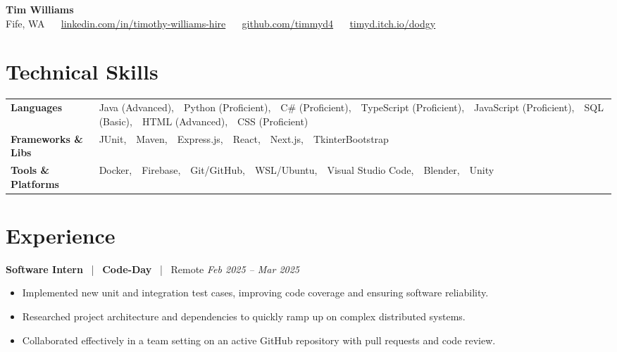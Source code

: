 \documentclass[10pt, letterpaper]{article}
\newcommand{\jobhead}[4]{%
  \vspace{5pt}%
  {\bfseries\color{dark}#1}%
  ~{\color{light}|}~%
  {\bfseries\color{navy}#2}%
  ~{\color{light}|}~%
  {\color{light}#3}%
  \hfill{\color{light}\small\textit{#4}}\\[-2pt]%
}
\newcommand{\skillrow}[2]{%
  {\bfseries #1} & #2 \\[2pt]%
}
\begin{document}

\begin{center}
  {\huge\bfseries\color{navy} Tim Williams}\\[4pt]
  {\small\color{light}
    Fife, WA
    ~\textbullet~
    \href{https://linkedin.com/in/timothy-williams-hire}{linkedin.com/in/timothy-williams-hire}
    ~\textbullet~
    \href{https://github.com/timmyd4}{github.com/timmyd4}
    ~\textbullet~
    \href{https://timyd.itch.io/dodgy}{timyd.itch.io/dodgy}
  }
\end{center}

\vspace{2pt}

\section{Technical Skills}

\begin{tabular}{@{}p{1.6in} p{5.2in}@{}}
  \skillrow{Languages}{Java (Advanced),\ \ Python (Proficient),\ \ C\# (Proficient),\ \ TypeScript (Proficient),\ \ JavaScript (Proficient),\ \ SQL (Basic),\ \ HTML (Advanced),\ \ CSS (Proficient)}
  \skillrow{Frameworks \& Libs}{JUnit,\ \ Maven,\ \ Express.js,\ \ React,\ \ Next.js,\ \ TkinterBootstrap}
  \skillrow{Tools \& Platforms}{Docker,\ \ Firebase,\ \ Git/GitHub,\ \ WSL/Ubuntu,\ \ Visual Studio Code,\ \ Blender,\ \ Unity}
\end{tabular}

\section{Experience}

\jobhead{Software Intern}{Code-Day}{Remote}{Feb 2025 – Mar 2025}
\begin{itemize}
  \item Implemented new unit and integration test cases, improving code coverage and ensuring software reliability.
  \item Researched project architecture and dependencies to quickly ramp up on complex distributed systems.
  \item Collaborated effectively in a team setting on an active GitHub repository with pull requests and code review.
\end{itemize}
\end{document}
